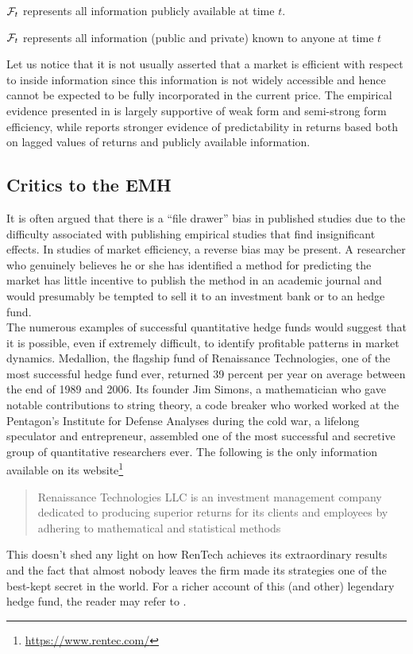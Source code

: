 \begin{definition}
	$\mathcal{F}_t$ represents all information publicly available at time $t$. 
\end{definition}

\begin{definition}
	$\mathcal{F}_t$ represents all information (public and private) known to anyone at time $t$	
\end{definition}
Let us notice that it is not usually asserted that a market is efficient with respect to inside information since this information is not widely accessible and hence cannot be expected to be fully incorporated in the
current price. The empirical evidence presented in \cite{malkiel1970efficient} is largely supportive of weak form and semi-strong form efficiency, while \cite{fama1991efficient} reports stronger evidence of predictability in returns based both on lagged values of returns and publicly available information.


\subsection{Critics to the EMH}

It is often argued that there is a ``file drawer'' bias in published studies due to the difficulty associated with publishing empirical studies that find insignificant effects. In studies of market efficiency, a reverse bias may be present. A researcher who genuinely believes he or she has identified a method for predicting the market has little incentive to publish the method in an academic journal and would presumably be tempted to sell it to an investment bank or to an hedge fund.\\
The numerous examples of successful quantitative hedge funds would suggest that it is possible, even if extremely difficult, to identify profitable patterns in market dynamics. Medallion, the flagship fund of Renaissance Technologies, one of the most successful hedge fund ever, returned 39 percent per year on average between the end of 1989 and 2006. Its founder Jim Simons, a mathematician who gave notable contributions to string theory, a code breaker who worked worked at the Pentagon’s Institute for Defense Analyses during the cold war, a lifelong speculator and entrepreneur, assembled one of the most successful and secretive group of quantitative researchers ever. The following is the only information available on its website\footnote{\url{https://www.rentec.com/}} 
\begin{quote}
Renaissance Technologies LLC is an investment management company dedicated to producing superior returns for its clients and employees by adhering to mathematical and statistical methods
\end{quote}
This doesn't shed any light on how RenTech achieves its extraordinary results and the fact that almost nobody leaves the firm made its strategies one of the best-kept secret in the world. For a richer account of this (and other) legendary hedge fund, the reader may refer to \cite{mallaby2010more}.  


